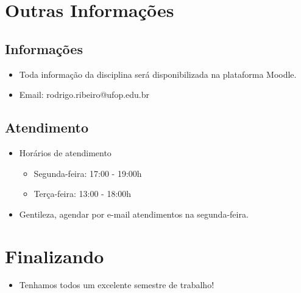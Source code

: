 \documentclass[11pt]{article}
\begin{document}
\section*{Outras Informações}
\label{sec:org867d311}

\subsection*{Informações}
\label{sec:orge9468cf}

\begin{itemize}
\item Toda informação da disciplina será disponibilizada na plataforma
Moodle.

\item Email: rodrigo.ribeiro@ufop.edu.br
\end{itemize}
\subsection*{Atendimento}
\label{sec:org973ceea}

\begin{itemize}
\item Horários de atendimento
\begin{itemize}
\item Segunda-feira: 17:00 - 19:00h
\item Terça-feira: 13:00 - 18:00h
\end{itemize}
\item Gentileza, agendar por e-mail atendimentos na segunda-feira.
\end{itemize}
\section*{Finalizando}
\label{sec:org1fa7453}

\begin{itemize}
\item Tenhamos todos um excelente semestre de trabalho!
\end{itemize}
\end{document}

